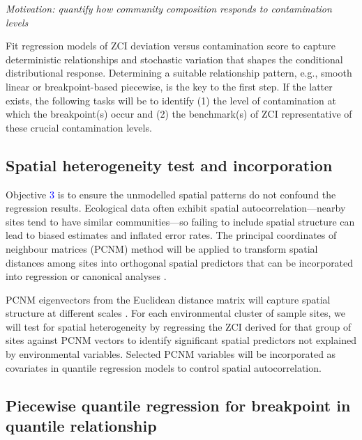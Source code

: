 \begin{enumerate}
    \emph{Motivation: quantify how community composition responds to contamination levels}

    Fit regression models of ZCI deviation versus contamination score to capture deterministic relationships 
        and stochastic variation that shapes the conditional distributional response.
        Determining a suitable relationship pattern, e.g., smooth linear or breakpoint-based piecewise,
        is the key to the first step.
        If the latter exists, the following tasks will be to identify (1) the level of contamination at which the breakpoint(s) occur and
        (2) the benchmark(s) of ZCI representative of these crucial contamination levels.
\end{enumerate}



\subsection{Spatial heterogeneity test and incorporation}

Objective \textcolor{blue}{3} is to ensure the unmodelled spatial patterns do not confound the regression results.
Ecological data often exhibit spatial autocorrelation—nearby sites tend to have similar communities—so
failing to include spatial structure can lead to biased estimates and inflated error rates.
The principal coordinates of neighbour matrices (PCNM) method will be applied to transform spatial distances among sites into orthogonal spatial
predictors that can be incorporated into regression or canonical analyses \cite{Borcard2002PCNM, Dray2006SpatialEigenfunction, GriffithPeresNeto2006SpatialFiltering}.

PCNM eigenvectors from the Euclidean distance matrix will capture spatial structure at different scales \cite{Borcard2002PCNM, GriffithPeresNeto2006SpatialFiltering}.
For each environmental cluster of sample sites, we will test for spatial heterogeneity by regressing the ZCI 
derived for that group of sites against PCNM vectors 
to identify significant spatial predictors not explained by environmental variables.
Selected PCNM variables will be incorporated as covariates in quantile regression models to control spatial autocorrelation.

\subsection{Piecewise quantile regression for breakpoint in quantile relationship}

